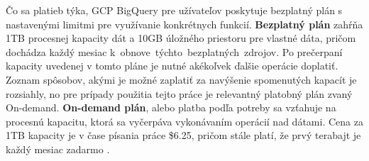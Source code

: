 \pagebreak

Čo sa platieb týka, GCP BigQuery pre užívateľov poskytuje bezplatný plán s nastavenými limitmi pre využívanie konkrétnych funkcií.
\textbf{Bezplatný plán} zahŕňa 1TB procesnej kapacity dát a 10GB úložného priestoru pre vlastné dáta, pričom dochádza každý mesiac \mbox{k obnove týchto bezplatných zdrojov}.
Po prečerpaní kapacity uvedenej v tomto pláne je nutné akékoľvek ďalšie operácie doplatiť.
Zoznam spôsobov, akými je možné zaplatiť za navýšenie spomenutých kapacít je rozsiahly, no pre prípady použitia tejto práce je relevantný platobný plán zvaný On-demand.
\textbf{On-demand plán}, alebo platba podľa potreby sa vzťahuje na procesnú kapacitu, ktorá sa vyčerpáva vykonávaním operácií nad dátami.
Cena za 1TB kapacity je v čase písania práce \$6.25, pričom stále platí, že prvý terabajt je každý mesiac zadarmo \cite{google-bq-pricing}.





